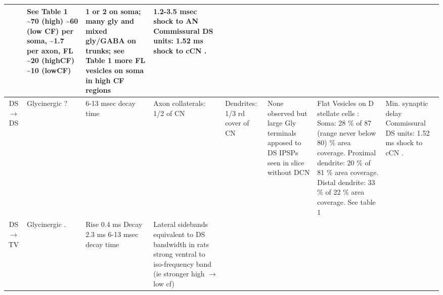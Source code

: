 \begin{longtable}{cYYYYYYY}
                                & %
\citep[mice][]{FerragamoGoldingEtAl:1998a} 
See Table 1 \citep[cat][]{SmithRhode:1989} 
\~{}70 (high) \~{}60 (low CF) per soma, 
\~{}1.7 per axon, FL \~{}20 (highCF)
\~{}10 (lowCF) \citep[chinchilla][]{JosephsonMorest:1998}                
                                & %
1 or 2 on soma; many gly and mixed gly/GABA on trunks; see Table 1\citep{SmithRhode:1989} 
more FL vesicles on soma in high CF regions \citep{JosephsonMorest:1998}      
                                & 
1.2-3.5 msec shock to AN \citep{FerragamoGoldingEtAl:1998a,NeedhamPaolini:2003,Oertel:1983}
Commissural DS units: 1.52 ms shock to cCN \citep{NeedhamPaolini:2006}.
\\ \midrule
DS\ensuremath{\rightarrow}DS                        
                                & %
Glycinergic                   \citep{FerragamoGoldingEtAl:1998a}?                    
                                & %
6-13 msec decay time \citep{AwatramaniTurecekEtAl:2005,HartyManis:1996,HartyManis:1998,LeaoOleskevichEtAl:2004}
                                & %
Axon collaterals: 1/2 of CN
                                & %
Dendrites: 1/3 rd cover of CN
                                & %
None observed but large Gly terminals apposed to DS \citep[cat][]{SmithRhode:1989} 
IPSPs seen in slice without DCN \citep{FerragamoGoldingEtAl:1998a}                     
                                & 
Flat Vesicles on D stellate cells \citep[cat][]{SmithRhode:1989}:
Soma: 28 \%  of 87 (range never below 80) \% area coverage. 
Proximal dendrite: 20 \%  of 81 \% area coverage.  
Distal dendrite: 33 \%  of 22 \% area coverage.   
See table 1 \citep{SmithRhode:1989}     
                                & 
Min. synaptic delay 
Commissural DS units: 1.52 ms shock to cCN \citep{NeedhamPaolini:2006}.
\\ \midrule
DS\ensuremath{\rightarrow}TV                        
                                & %
Glycinergic \citep{DoucetRyugoEtAl:1999,OertelWuEtAl:1990,OstapoffMorestEtAl1999,SpirouDavisEtAl:1999,ZhangOertel:1993}. 
                                & 
Rise 0.4 ms Decay 2.3 ms \citep{AwatramaniTurecekEtAl:2005}
6-13 msec decay time \citep{FerragamoGoldingEtAl:1998a,HartyManis:1996,HartyManis:1998,LeaoOleskevichEtAl:2004}
                                & 
Lateral sidebands equivalent to DS bandwidth
\citep{OstapoffMorestEtAl:1999,SpirouDavisEtAl:1999} 
in rats strong ventral to iso-frequency band (ie stronger high \ensuremath{\rightarrow}low cf)
\citep{DoucetRyugoEtAl:1999,FriedlandPongstapornEtAl:2003} 

\end{longtable}
